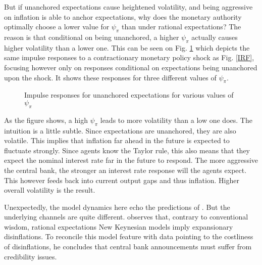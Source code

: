 \documentclass[11pt]{article}
\def \myFigPath {../../figures/}
\renewcommand{\[}{\begin{equation}}
\renewcommand{\]}{\end{equation}}
\def\mySmallerFigScale{0.18}
\begin{document}
But if unanchored expectations cause heightened volatility, and being aggressive on inflation is able to anchor expectations, why does the monetary authority optimally choose a lower value for $\psi_{\pi}$ than under rational expectations? The reason is that conditional on being unanchored, a higher $\psi_{\pi}$ actually causes higher volatility than a lower one. This can be seen on Fig. \ref{IRF_unanchored_psi} which depicts the same impulse responses to a contractionary monetary policy shock as Fig. \ref{IRF}, focusing however only on responses conditional on expectations being unanchored upon the shock. It shows these responses for three different values of $\psi_{\pi}$.

\begin{figure}[h!]
\caption{Impulse responses for unanchored expectations for various values of $\psi_{\pi}$}
\floatfoot{}
\label{IRF_unanchored_psi}
\end{figure}

As the figure shows, a high $\psi_{\pi}$ leads to more volatility than a low one does. The intuition is a little subtle. Since expectations are unanchored, they are also volatile. This implies that inflation far ahead in the future is expected to fluctuate strongly. Since agents know the Taylor rule, this also means that they expect the nominal interest rate far in the future to respond. The more aggressive the central bank, the stronger an interest rate response will the agents expect. This however feeds back into current output gaps and thus inflation. Higher overall volatility is the result.

Unexpectedly, the model dynamics here echo the predictions of \cite{ball1994credible}. But the underlying channels are quite different. \cite{ball1994credible} observes that, contrary to conventional wisdom, rational expectations New Keynesian models imply expansionary disinflations. To reconcile this model feature with data pointing to the costliness of disinflations, he concludes that central bank announcements must suffer from credibility issues. 
\end{document}
